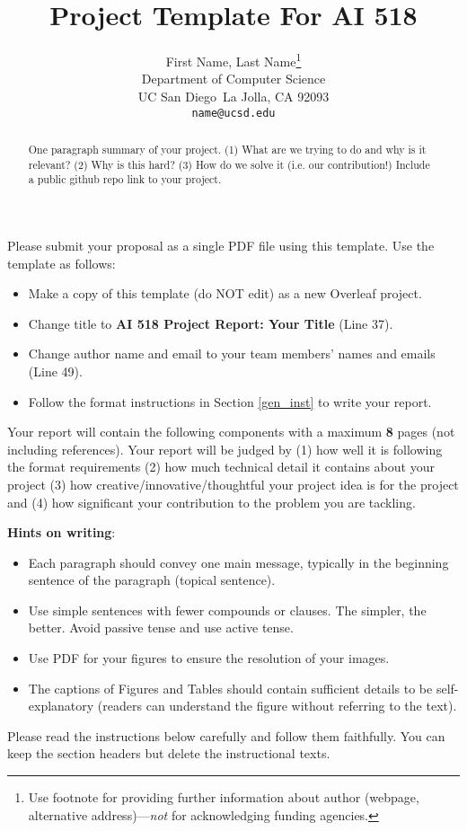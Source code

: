 \documentclass{article}
\title{Project Template For AI 518}
\author{%
  First Name, Last Name\thanks{Use footnote for providing further information
    about author (webpage, alternative address)---\emph{not} for acknowledging
    funding agencies.} \\
  Department of Computer Science\\
  UC San Diego\
  La Jolla, CA 92093 \\
  \texttt{name@ucsd.edu} \\
}
\newcommand{\new}[1]{{\color{red} #1}}
\begin{document}
\maketitle


\begin{abstract}
  One paragraph summary of your project. (1) What are we trying to do and why is it relevant?
(2) Why is this hard?  (3) How do we solve it (i.e. our contribution!)
\new{Include a public github repo link to your project.}
\end{abstract}
\noindent Please submit your proposal  as a single PDF file using this template. Use the template as follows:
\begin{itemize}
    \item Make a copy of this template (do NOT edit) as a new Overleaf project.
    \item Change title to \textbf{AI 518 Project Report: Your Title} (Line 37).
    \item Change author name and email to your  team members' names and emails (Line 49).
    \item Follow the format instructions in Section \ref{gen_inst} to write your report.
\end{itemize}
Your report will contain the following components with a maximum \new{\textbf{8}} pages (not including references). Your report will be judged by (1) how well it is following the format requirements  (2) how much technical detail it contains about  your  project (3) how creative/innovative/thoughtful  your  project idea is for the project and (4) how significant your contribution to the problem you are tackling. 

\textbf{Hints on writing}:
\begin{itemize}
    \item Each paragraph should convey one main message, typically in the beginning sentence of the paragraph (topical sentence).
    \item  Use simple sentences with fewer compounds or clauses. The simpler, the better. Avoid passive tense and use active tense.
    \item Use PDF for your figures to ensure the resolution of your images.
    \item The captions of Figures and Tables should contain sufficient details to be self-explanatory (readers can understand the figure without referring to the text).
\end{itemize}
Please read the instructions below carefully and follow them faithfully. You can keep the section headers but delete the instructional texts.
\end{document}
